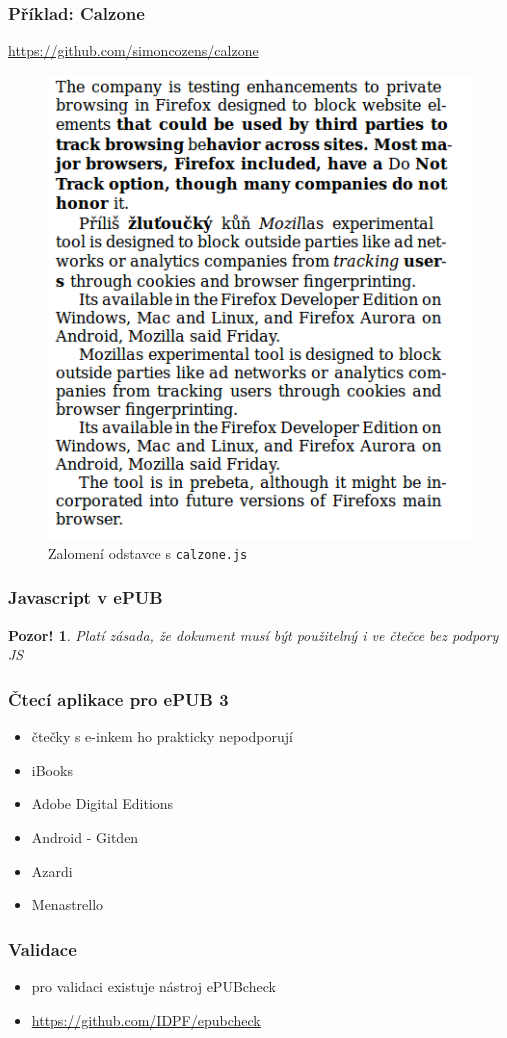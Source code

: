 \documentclass[czech]{beamer}
\newtheorem{pozor}{Pozor!}
\begin{document}
\begin{frame}
        \frametitle{Příklad: Calzone }
\url{https://github.com/simoncozens/calzone}
\begin{figure}
  \includegraphics[width=.6\textwidth]{examples/with-calzone.png}
  \caption{Zalomení odstavce s \texttt{calzone.js}}
  \end{figure}
\end{frame}
\begin{frame}
  \frametitle{Javascript v ePUB}
\begin{pozor}
        Platí zásada, že dokument musí být použitelný i ve čtečce bez podpory JS
      \end{pozor}
\end{frame}
\begin{frame}
  \frametitle{Čtecí aplikace pro ePUB 3}
  \begin{itemize}
  \item čtečky s e-inkem ho prakticky nepodporují
  \item iBooks
  \item Adobe Digital Editions
  \item Android - Gitden
  \item Azardi
  \item Menastrello
\end{itemize}
\end{frame}
\begin{frame}
  \frametitle{Validace}
  \begin{itemize}
    \item pro validaci existuje nástroj ePUBcheck
    \item \url{https://github.com/IDPF/epubcheck}
  \end{itemize}
\end{frame}
\end{document}
